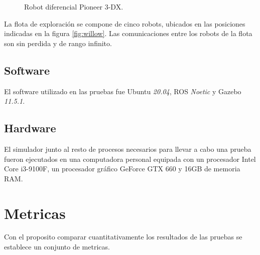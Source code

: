\begin{figure}[H]
  \centerfloat

  \qquad

  \caption[Robot diferencial Pioneer 3-DX.]{Robot diferencial Pioneer 3-DX.}\label{fig:p3dx}

\end{figure}

La flota de exploración se compone de cinco robots, ubicados en las posiciones
indicadas en la figura \ref{fig:willow}. Las comunicaciones entre los robots de
la flota son sin perdida y de rango infinito.

\subsection{Software}
El software utilizado en las pruebas fue Ubuntu \emph{20.04}, ROS \emph{Noetic} y Gazebo
\emph{11.5.1}. 

\subsection{Hardware}
El simulador junto al resto de procesos necesarios para llevar a cabo una
prueba fueron ejecutados en una computadora personal equipada con un procesador
Intel Core i3-9100F, un procesador gráfico GeForce GTX 660 y 16GB de memoria
RAM.

\section{Metricas}
Con el proposito comparar cuantitativamente los resultados de las pruebas se
establece un conjunto de metricas. 


